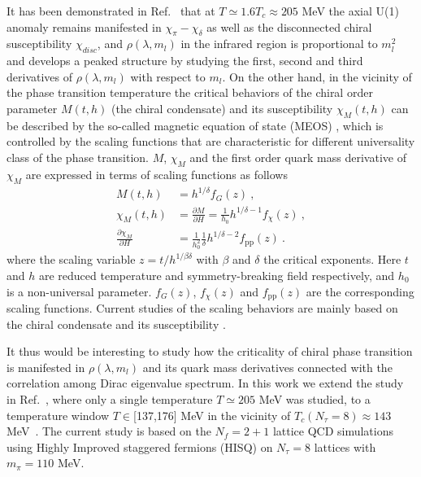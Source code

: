 \documentclass[a4paper,11pt]{article}
\numberwithin{equation}{section}
\begin{document}
It has been demonstrated in Ref.~\cite{Ding:2020xlj} that at $T\simeq 1.6 T_c\approx205$ MeV the axial U(1) anomaly remains manifested in $\chi_{\pi}-\chi_{\delta}$ as well as the disconnected chiral susceptibility $\chi_{disc}$, and $\rho(\lambda, m_l)$ in the infrared region is proportional to $m_l^2$ and develops a peaked structure by studying the first, second and third derivatives of $\rho(\lambda,m_l)$ with respect to $m_l$. On the other hand, in the vicinity of the phase transition temperature the critical behaviors of the chiral order parameter $M(t, h)$ (the chiral condensate) and its susceptibility $\chi_M(t, h)$ can be described by the so-called magnetic equation of state (MEOS) \cite{Ejiri:2009ac}, which is controlled by the scaling functions that are characteristic for different universality class of the phase transition. $M$, $\chi_M$ and the first order quark mass derivative of $\chi_M$ are expressed in terms of scaling functions as follows
\begin{align}
M(t, h)
&=h^{1 / \delta} f_{G}(z)~,
\\
\chi_{M}(t, h)
&=\frac{\partial M}{\partial H}
=\frac{1}{h_{0}} h^{1 / \delta-1} f_{\chi}(z)~,
\\
\label{fpp}
\frac{\partial \chi_M}{\partial H} 
&= \frac{1}{h_{0}^{2}} \frac{1}{\delta} h^{1 / \delta-2} f_{\mathrm{pp}}(z)~.
\end{align}
where the scaling variable $z=t / h^{1 / \beta \delta}$ with $\beta$ and $\delta$ the critical exponents. Here $t$ and $h$ are reduced temperature and symmetry-breaking field respectively, and $h_0$ is a non-universal parameter. $f_G(z)$, $f_{\chi}(z)$ and $f_{\mathrm{pp}}(z)$ are the corresponding scaling functions.
Current studies of the scaling behaviors are mainly based on the chiral condensate and its susceptibility \cite{HotQCD:2019xnw, Ejiri:2009ac}.

It thus would be interesting to study how the criticality of chiral phase transition is manifested in $\rho(\lambda, m_l)$ and its quark mass derivatives connected with the correlation among Dirac eigenvalue spectrum. In this work we extend the study in Ref.~\cite{Ding:2020xlj}, where only a single temperature $T\simeq 205$ MeV was studied, to a temperature window $T\in$[137,176] MeV in the vicinity of $T_c(N_\tau=8)\approx143$ MeV~\cite{HotQCD:2019xnw}. The current study is based on the $N_f=2+1$ lattice QCD simulations using Highly Improved staggered fermions (HISQ) on $N_\tau=8$ lattices with $m_\pi=110$ MeV. 
\end{document}
